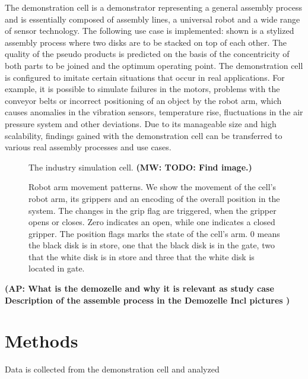 \documentclass[5p,times,procedia]{elsarticle}
\newcommand{\AP}[1]{{\color{blue} {\bf (AP: #1)}}}
\newcommand{\MW}[1]{{\color{teal} {\bf (MW: #1)}}}
\begin{document}
The demonstration cell is a demonstrator representing a general assembly process
and is essentially composed of assembly lines, a universal robot and a wide
range of sensor technology. The following use case is implemented:
shown is a stylized assembly process where two disks are to be stacked on top of each other.
The quality of the pseudo products is predicted on the basis of the concentricity of both
parts to be joined and the optimum operating point. The demonstration cell is configured to 
imitate certain situations that occur in real applications. For example, it is possible to 
simulate failures in the motors, problems with the conveyor belts or incorrect
positioning of an object by the robot arm, which causes anomalies in the vibration sensors,
temperature rise, fluctuations in the air pressure system and other deviations. 
Due to its manageable size and high scalability,
findings gained with the demonstration cell can be transferred to various real
assembly processes and use cases.

\begin{figure}
\caption{The industry simulation cell. \MW{TODO: Find image.}}
\label{fig:ind_cell}
\end{figure}

\begin{figure}
       
       \caption{Robot arm movement patterns. We show the movement of the 
                cell's robot arm, its grippers and an encoding of the overall
                position in the system. The changes in the grip flag are triggered,
                when the gripper opens or closes. Zero indicates an open, while
                one indicates a closed gripper. The position flags marks the state
                of the cell's arm.  0 means the black disk is in store,
                one that the black disk is in the gate, two that the white disk
                is in store and three that the white disk is located in gate.
             }
\label{fig:robot_pos_cell}
\end{figure}


\AP{
What is the demozelle and why it is relevant as study case
Description of the assemble process in the Demozelle 
Incl pictures
}


\section{Methods} %

Data  is collected from the demonstration cell and analyzed 
\end{document}
